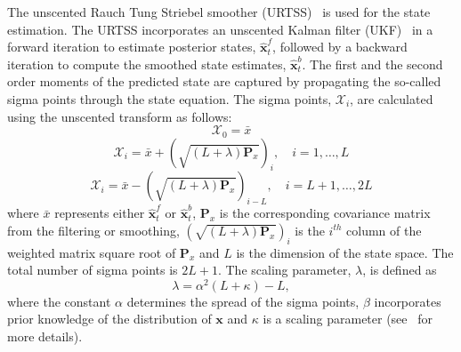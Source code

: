 \documentclass[10pt,a4paper]{article}
\begin{document}
The unscented Rauch Tung Striebel smoother (URTSS)~\cite{Sarkka2010} is used for the state estimation. The URTSS incorporates an unscented Kalman filter (UKF)~\cite{Julier1997, Merwe2003} in a forward iteration to estimate posterior states, $\hat{\mathbf x}_t^{f}$, followed by a backward iteration to compute the smoothed state estimates, $\hat{\mathbf x}_t^{b}$. The first and the second order moments of the predicted state are captured by propagating the so-called sigma points through the state equation. The sigma points, $\mathcal X_i$, are calculated using the unscented transform as follows:
\begin{equation}\label{eq:sigmapoints1}
	\mathcal X_{0}=\bar x 
\end{equation}
\begin{equation}
	\mathcal X_{i}=\bar x+\left(\sqrt{( L + \lambda)\mathbf P_x}\right)_i, \quad i=1, \dots, L 
\end{equation}
\begin{equation}\label{eq:sigmapoints2}
	\mathcal X_{i}=\bar x-\left(\sqrt{( L + \lambda)\mathbf P_x}\right)_{i- L}, \quad i= L+1, \dots, 2 L 
\end{equation}
where $\bar x$ represents either $\hat{\mathbf x}_t^{f}$ or $\hat{\mathbf x}_t^{b}$, $\mathbf{P}_x$ is the corresponding covariance matrix from the filtering or smoothing, $\left(\sqrt{( L + \lambda)\mathbf P_x}\right)_i$ is the $i^{th}$ column of the weighted matrix square root of $\mathbf P_x$ and $L$ is the dimension of the state space. The total number of sigma points is $2L+1$. The scaling parameter, $\lambda$, is defined as 
\begin{equation}\label{eq:sigmapoints3}
	\lambda=\alpha^2( L+\kappa) - L, 
\end{equation}
where the constant $\alpha$ determines the spread of the sigma points, $\beta$ incorporates prior knowledge of the distribution of $\mathbf{x}$ and $\kappa$ is a scaling parameter (see~\cite{Haykin2001} for more details). 
\end{document}
